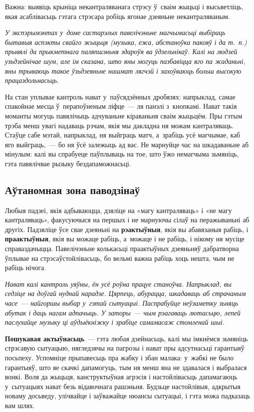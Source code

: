 Важна: выявіць крыніца некантраляванага стрэсу ў~сваім жыцьці і высьветліць, якая асаблівасьць гэтага стрэсара робіць ягонае дзеяньне некантраляваным. 

\emph{У экспэрымэнтах у~доме састарэлых павелічэньне магчымасьці выбіраць бытавыя аспэкты свайго жыцьця (музыка, ежа, абстаноўка пакояў і да т.~п.) прывялі да прыкметнага паляпшэньня здароўя ва ўдзельнікаў. Калі на людзей узьдзейнічае шум, але ім сказана, што яны могуць пазбавіцца яго па жаданьні, яны трываюць такое ўзьдзеяньне нашмат лягчэй і захоўваюць больш высокую працаздольнасьць.}

На стан уплывае кантроль нават у~паўсядзённых дробязях: напрыклад, самае спакойнае месца ў~перапоўненым ліфце~--- ля панэлі з~кнопкамі. Нават такія моманты могуць павялічыць адчуваньне кіраваньня сваім жыцьцём. Пры гэтым трэба менш увагі надаваць рэчам, якія мы дакладна ня можам кантраляваць. Стаўце сабе мэтай, напрыклад, ня выйграць матч, а~зрабіць усё магчымае, каб яго выйграць,~--- бо ня ўсё залежыць ад вас. Не марнуйце час на шкадаваньне аб мінулым: калі вы спрабуеце паўплываць на тое, што ўжо немагчыма зьмяніць, гэта павялічвае рызыку бездапаможнасьці.

\subsection*{Аўтаномная зона паводзінаў}

Любыя падзеі, якія адбываюцца, дзяліце на «магу кантраляваць» і «не магу кантраляваць», факусуючыся на першых і не марнуючы сілаў на перажываньні аб другіх. Падзяліце ўсе свае дзеяньні на \textbf{рэактыўныя}, якія вы абавязаныя рабіць, і \textbf{праактыўныя}, якія вы можаце рабіць, а~можаце і не рабіць, і нікому ня мусіце справаздачыцца. Павелічэньне колькасьці праактыўных дзеяньняў дабратворна ўплывае на стрэсаўстойлівасьць, бо вельмі важна рабіць хоць нешта, чым не рабіць нічога.

\emph{Нават калі кантроль уяўны, ён усё роўна працуе станоўча. Напрыклад, вы седзіце на доўгай нуднай нарадзе. Цярпець, абурацца, шкадаваць аб страчаным часе~--- найгоршы выбар у~гэтай сытуацыі. Паспрабуйце неўзаметку зьняць абутак і даць нагам адпачыць. У заторы~--- чым рэагаваць лютасьцю, лепей паслухайце музыку ці аўдыёкніжку і зрабіце самамасаж стомленай шыі.}

\textbf{Пошукавая актыўнасьць}~--- гэта любая дзейнасьць, калі мы імкнёмся зьмяніць стрэсавую сытуацыю, нягледзячы на пагрозы і нават пры адсутнасьці гарантыяў посьпеху. Успомніце прыпавесьць пра жабку і збан малака: у~жабкі не было гарантыяў, што яе скачкі дапамогуць, тым ня менш яна не здавалася і выбралася вонкі. Воля да жыцьця, канструктыўная агрэсія і настойлівасьць дапамагаюць у~сытуацыях нават безь відавочнага рашэньня. Будзьце настойлівыя, адкрытыя новаму досьведу, улічвайце і заўважайце нюансы сытуацыі, і гэта можа падказаць вам шлях. 

